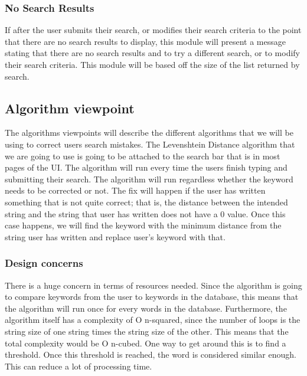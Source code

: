 \documentclass[journal,compsoc, 10pt, draftclsnofoot, onecolumn]{IEEEtran}
\begin{document}
\subsubsection*{No Search Results}
If after the user submits their search, or modifies their search criteria to the
 point that there are no search results to display, this module will present a 
message stating that there are no search results and to try a different search, 
or to modify their search criteria. This module will be based off the size of 
the list returned by search.

\subsection{Algorithm viewpoint}
The algorithms viewpoints will describe the different algorithms that we will be
 using to correct users search mistakes. The Levenshtein Distance algorithm that 
we are going to use is going to be attached to the search bar that is in most 
pages of the UI. The algorithm will run every time the users finish typing and 
submitting their search. The algorithm will run regardless whether the keyword 
needs to be corrected or not. The fix will happen if the user has written 
something that is not quite correct; that is, the distance between the intended 
string and the string that user has written does not have a 0 value. Once this 
case happens, we will find the keyword with the minimum distance from the string 
user has written and replace user's keyword with that.

\subsubsection*{Design concerns}
There is a huge concern in terms of resources needed. Since the algorithm is 
going to compare keywords from the user to keywords in the database, this 
means that the algorithm will run once for every words in the database. 
Furthermore, the algorithm itself has a complexity of O n-squared, since the 
number of loops is the string size of one string times the string size of the 
other. This means that the total complexity would be O n-cubed. One way to get 
around this is to find a threshold. Once this threshold is reached, the word 
is considered similar enough. This can reduce a lot of processing time.
\end{document}
